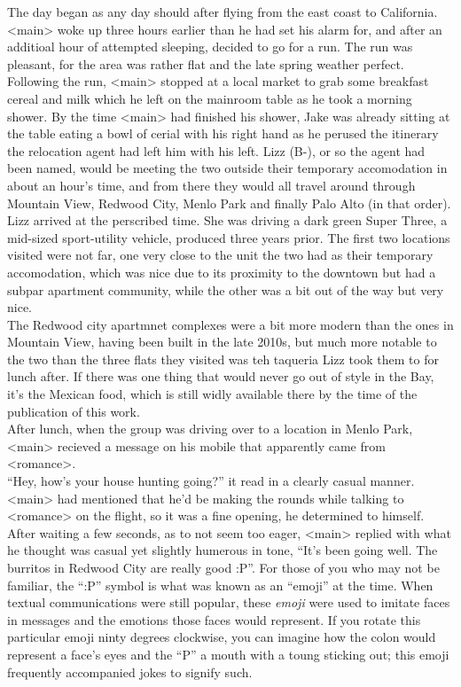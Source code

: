 \documentclass[12pt,openany]{memoir}
\begin{document}
The day began as any day should after flying from the east coast to California.
<main> woke up three hours earlier than he had set his alarm for, and after an additioal hour of attempted sleeping, decided to go for a run.
The run was pleasant, for the area was rather flat and the late spring weather perfect.
Following the run, <main> stopped at a local market to grab some breakfast cereal and milk which he left on the mainroom table as he took a morning shower.
By the time <main> had finished his shower, Jake was already sitting at the table eating a bowl of cerial with his right hand as he perused the itinerary the relocation agent had left him with his left.
Lizz (B-), or so the agent had been named, would be meeting the two outside their temporary accomodation in about an hour's time, and from there they would all travel around through Mountain View, Redwood City, Menlo Park and finally Palo Alto (in that order).
\\

Lizz arrived at the perscribed time.
She was driving a dark green Super Three, a mid-sized sport-utility vehicle, produced three years prior.
The first two locations visited were not far, one very close to the unit the two had as their temporary accomodation, which was nice due to its proximity to the downtown but had a subpar apartment community, while the other was a bit out of the way but very nice.
\\

The Redwood city apartmnet complexes were a bit more modern than the ones in Mountain View, having been built in the late 2010s, but much more notable to the two than the three flats they visited was teh taqueria Lizz took them to for lunch after.
If there was one thing that would never go out of style in the Bay, it's the Mexican food, which is still widly available there by the time of the publication of this work.
\\

After lunch, when the group was driving over to a location in Menlo Park, <main> recieved a message on his mobile that apparently came from <romance>.
\\

``Hey, how's your house hunting going?'' it read in a clearly casual manner.  <main> had mentioned that he'd be making the rounds while talking to <romance> on the flight, so it was a fine opening, he determined to himself.
\\

After waiting a few seconds, as to not seem too eager, <main> replied with what he thought was casual yet slightly humerous in tone, ``It's been going well.  The burritos in Redwood City are really good :P''.
For those of you who may not be familiar, the ``:P'' symbol is what was known as an ``emoji'' at the time.
When textual communications were still popular, these \textit{emoji} were used to imitate faces in messages and the emotions those faces would represent.
If you rotate this particular emoji ninty degrees clockwise, you can imagine how the colon would represent a face's eyes and the ``P'' a mouth with a toung sticking out; this emoji frequently accompanied jokes to signify such.
\\
\end{document}
